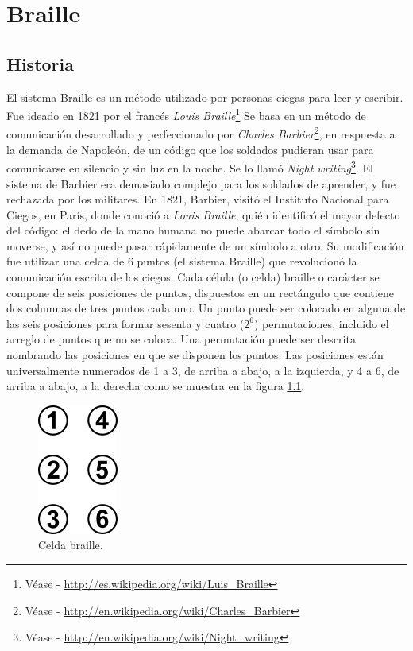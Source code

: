 \chapter{Braille}
%
\section{Historia}
El sistema Braille es un m\'etodo utilizado por personas ciegas para leer y 
escribir. Fue ideado en 1821 por el franc\'es \emph{Louis
Braille}\footnote{V\'ease - \url{http://es.wikipedia.org/wiki/Luis_Braille}}
Se basa en un m\'etodo de comunicaci\'on desarrollado y perfeccionado por 
\emph{Charles Barbier}\footnote{V\'ease -
\url{http://en.wikipedia.org/wiki/Charles_Barbier}}, en respuesta a la demanda
de Napole\'on, de un c\'odigo que los soldados pudieran usar para comunicarse
en silencio y sin luz en la noche.
Se lo llam\'o \emph{Night writing}\footnote{V\'ease -
\url{http://en.wikipedia.org/wiki/Night_writing}}. El sistema de Barbier era
demasiado complejo para los soldados de aprender, y fue rechazada por los
militares. 
En 1821, Barbier, visit\'o el Instituto Nacional para Ciegos, en Par\'is, donde
conoci\'o a \emph{Louis Braille}, qui\'en identific\'o el mayor defecto del
c\'odigo: el dedo de la mano humana no puede abarcar todo el s\'imbolo sin
moverse, y as\'i no puede pasar r\'apidamente de un s\'imbolo a otro.
Su modificaci\'on fue utilizar una celda de 6 puntos (el sistema Braille) que 
revolucion\'o la comunicaci\'on escrita de los ciegos.
Cada c\'elula (o celda) braille o car\'acter se compone de seis posiciones de 
puntos, dispuestos en un rect\'angulo que contiene dos columnas de tres puntos
cada uno. Un punto puede ser colocado en alguna de las seis posiciones para
formar sesenta y cuatro ($2^{6}$) permutaciones, incluido el arreglo de puntos
que no se coloca. Una permutaci\'on puede ser descrita nombrando las posiciones
en que se disponen los puntos: Las posiciones est\'an universalmente numerados
de 1 a 3, de arriba a abajo, a la izquierda, y 4 a 6, de arriba a abajo, a la
derecha como se muestra en la figura \ref{fig:braille_cell}.

\clearpage
\begin{figure}[htp]
\centering
\includegraphics[scale=0.6]{./img/braille_cell.png}
\caption{Celda braille.}
\label{fig:braille_cell}
\end{figure}
\label{cap:braille_cell}

